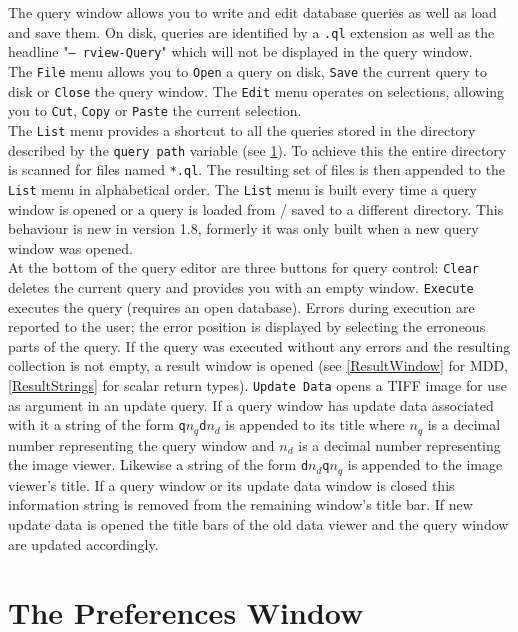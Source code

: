 \documentclass[11pt]{article}
\begin{document}
The query window allows you to write and edit database queries as well as load
and save them. On disk, queries are identified by a \texttt{.ql} extension as well
as the headline "\texttt{-- rview-Query}" which will not be displayed in the query
window.\\
The \texttt{File} menu allows you to \texttt{Open} a query on disk, \texttt{Save} the
current query to disk or \texttt{Close} the query window. The \texttt{Edit} menu
operates on selections, allowing you to \texttt{Cut}, \texttt{Copy} or \texttt{Paste} the
current selection.\\
The \texttt{List} menu provides a shortcut to all the queries stored in the
directory described by the \texttt{query path} variable (see \ref{PreferencesEditor}).
To achieve this the entire directory is scanned for files named
\texttt{*.ql}. The resulting set of files is then appended to the \texttt{List} menu
in alphabetical order. The \texttt{List} menu is built every time a query
window is opened or a query is loaded from / saved to a different directory.
This behaviour is new in version 1.8, formerly it was only built when a new
query window was opened.\\
At the bottom of the query editor are three buttons for query control:
\texttt{Clear} deletes the current query and provides you with an empty window.
\texttt{Execute} executes the query (requires an open database). Errors
during execution are reported to the user; the error position is displayed
by selecting the erroneous parts of the query. If the query was executed
without any errors and the resulting collection is not empty, a result window is
opened (see \ref{ResultWindow} for MDD, \ref{ResultStrings} for scalar return
types). \texttt{Update Data} opens a TIFF image for use as \texttt{} argument
in an update query. If a query window has update data associated with it a string
of the form \texttt{q$n_q$d$n_d$} is appended to its title where \texttt{$n_q$} is a
decimal number representing the query window and \texttt{$n_d$} is a decimal number
representing the image viewer. Likewise a string of the form \texttt{d$n_d$q$n_q$} is
appended to the image viewer's title. If a query window or its update data
window is closed this information string is removed from the remaining window's
title bar. If new update data is opened the title bars of the old data viewer and
the query window are updated accordingly.


\section{The Preferences Window}
\label{PreferencesEditor}
\end{document}
